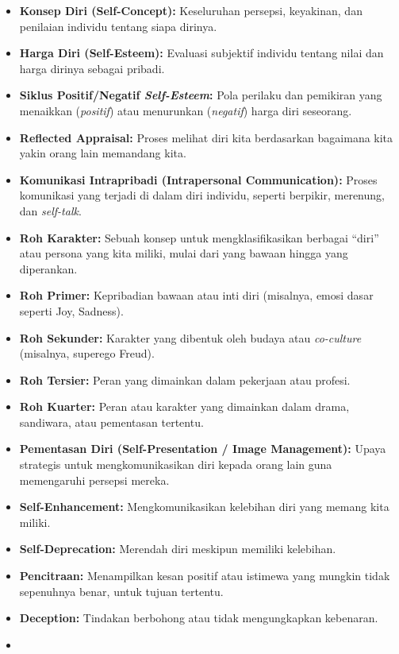 \documentclass[
  letterpaper,
  DIV=11,
  numbers=noendperiod]{scrreprt}
\providecommand{\tightlist}{%
  \setlength{\itemsep}{0pt}\setlength{\parskip}{0pt}}
\begin{document}
\begin{itemize}
\tightlist
\item
  \textbf{Konsep Diri (Self-Concept):} Keseluruhan persepsi, keyakinan,
  dan penilaian individu tentang siapa dirinya.
\item
  \textbf{Harga Diri (Self-Esteem):} Evaluasi subjektif individu tentang
  nilai dan harga dirinya sebagai pribadi.
\item
  \textbf{Siklus Positif/Negatif \emph{Self-Esteem}:} Pola perilaku dan
  pemikiran yang menaikkan (\emph{positif}) atau menurunkan
  (\emph{negatif}) harga diri seseorang.
\item
  \textbf{Reflected Appraisal:} Proses melihat diri kita berdasarkan
  bagaimana kita yakin orang lain memandang kita.
\item
  \textbf{Komunikasi Intrapribadi (Intrapersonal Communication):} Proses
  komunikasi yang terjadi di dalam diri individu, seperti berpikir,
  merenung, dan \emph{self-talk}.
\item
  \textbf{Roh Karakter:} Sebuah konsep untuk mengklasifikasikan berbagai
  ``diri'' atau persona yang kita miliki, mulai dari yang bawaan hingga
  yang diperankan.
\item
  \textbf{Roh Primer:} Kepribadian bawaan atau inti diri (misalnya,
  emosi dasar seperti Joy, Sadness).
\item
  \textbf{Roh Sekunder:} Karakter yang dibentuk oleh budaya atau
  \emph{co-culture} (misalnya, superego Freud).
\item
  \textbf{Roh Tersier:} Peran yang dimainkan dalam pekerjaan atau
  profesi.
\item
  \textbf{Roh Kuarter:} Peran atau karakter yang dimainkan dalam drama,
  sandiwara, atau pementasan tertentu.
\item
  \textbf{Pementasan Diri (Self-Presentation / Image Management):} Upaya
  strategis untuk mengkomunikasikan diri kepada orang lain guna
  memengaruhi persepsi mereka.
\item
  \textbf{Self-Enhancement:} Mengkomunikasikan kelebihan diri yang
  memang kita miliki.
\item
  \textbf{Self-Deprecation:} Merendah diri meskipun memiliki kelebihan.
\item
  \textbf{Pencitraan:} Menampilkan kesan positif atau istimewa yang
  mungkin tidak sepenuhnya benar, untuk tujuan tertentu.
\item
  \textbf{Deception:} Tindakan berbohong atau tidak mengungkapkan
  kebenaran.
\item

\end{itemize}
\end{document}
